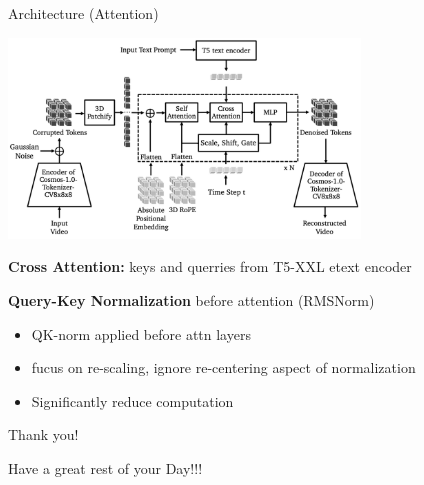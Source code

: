\documentclass{beamer}
\begin{document}
\begin{frame}[t]{Architecture (Attention)}
    \vspace{-1.6em}
    \begin{center}
        \includegraphics[width=0.7\textwidth]{./img/diffusion_arch.png}
    \end{center}
    \textbf{Cross Attention:} keys and querries from T5-XXL etext encoder\newline

    \textbf{Query-Key Normalization} before attention (RMSNorm) 
    \begin{itemize}[label=-]
        \item  QK-norm applied before attn layers
        \item  fucus on re-scaling, ignore re-centering aspect of normalization
        \item Significantly reduce computation
   \end{itemize}
\end{frame}

\begin{frame}{Thank you!}
	\begin{center}
        Have a great rest of your Day!!!
	\end{center}
	\begin{center}
	\end{center}
\end{frame}
\end{document}
